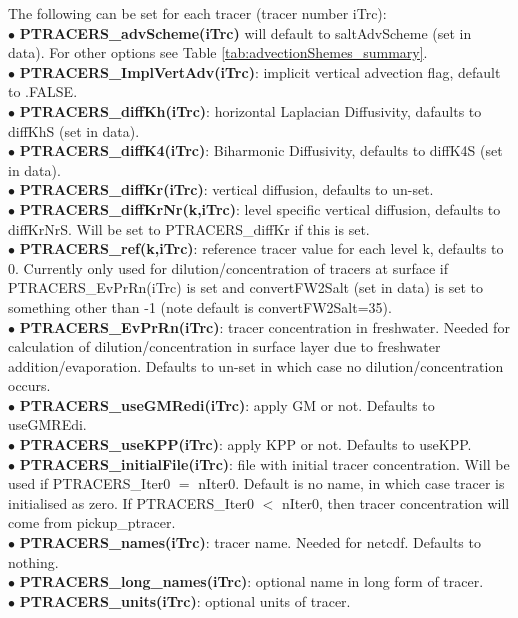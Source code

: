 The following can be set for each tracer (tracer number iTrc):\\
$\bullet$  {\bf PTRACERS\_advScheme(iTrc)} will default to saltAdvScheme (set in data). For other options see Table \ref {tab:advectionShemes_summary}.\\
$\bullet$  {\bf PTRACERS\_ImplVertAdv(iTrc)}: implicit vertical advection flag,
 default to .FALSE.\\
$\bullet$  {\bf PTRACERS\_diffKh(iTrc)}: horizontal Laplacian Diffusivity,
dafaults to diffKhS (set in data).\\
$\bullet$  {\bf PTRACERS\_diffK4(iTrc)}: Biharmonic Diffusivity, defaults to
diffK4S (set in data).\\
$\bullet$  {\bf PTRACERS\_diffKr(iTrc)}: vertical diffusion, defaults to un-set.\\
$\bullet$  {\bf PTRACERS\_diffKrNr(k,iTrc)}: level specific vertical diffusion,
defaults to diffKrNrS. Will be set to PTRACERS\_diffKr if this is set.\\
$\bullet$  {\bf PTRACERS\_ref(k,iTrc)}: reference tracer value for each level k, 
defaults to 0. Currently only used for
dilution/concentration of tracers at surface if  PTRACERS\_EvPrRn(iTrc) is
set and convertFW2Salt (set in data) is set to something other than -1
(note default is convertFW2Salt=35).\\
$\bullet$  {\bf PTRACERS\_EvPrRn(iTrc)}: tracer concentration in freshwater.
Needed for calculation of dilution/concentration in surface layer due to
freshwater addition/evaporation. Defaults to un-set in which case no
dilution/concentration occurs.\\
$\bullet$  {\bf PTRACERS\_useGMRedi(iTrc)}: apply GM or not. Defaults to
useGMREdi.\\
$\bullet$  {\bf PTRACERS\_useKPP(iTrc)}: apply KPP or not. Defaults to
useKPP.\\
$\bullet$  {\bf PTRACERS\_initialFile(iTrc)}: file with initial tracer 
concentration. Will be used if PTRACERS\_Iter0 $=$ nIter0. Default
is no name, in which case tracer is initialised as zero. If 
 PTRACERS\_Iter0 $<$ nIter0, then tracer concentration will come
from pickup\_ptracer.\\
$\bullet$  {\bf PTRACERS\_names(iTrc)}: tracer name. Needed for netcdf.
Defaults to nothing.\\
$\bullet$  {\bf PTRACERS\_long\_names(iTrc)}: optional name in long form
of tracer.\\
$\bullet$  {\bf PTRACERS\_units(iTrc)}: optional units of tracer.
\\


